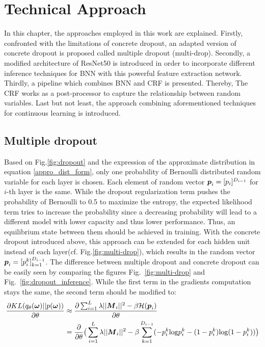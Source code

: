 \chapter{Technical Approach}
In this chapter, the approaches employed in this work are explained.
Firstly, confronted with the limitations of concrete dropout, an adapted version of concrete dropout is proposed called multiple dropout (multi-drop).
Secondly, a modified architecture of ResNet50 is introduced in order to incorporate different inference techniques for \gls{BNN} with this powerful feature extraction network.
Thirdly, a pipeline which combines \gls{BNN} and \gls{CRF} is presented.
Thereby, The \gls{CRF} works as a post-processor to capture the relationship between random variables.
Last but not least, the approach combining aforementioned techniques for continuous learning is introduced.


\section{Multiple dropout}
Based on Fig.\ref{fig:dropout} and the expression of the approximate distribution in equation \ref{appro_dist_form}, only one probability of Bernoulli distributed random variable for each layer is chosen. Each element of random vector $\boldsymbol p_i = [p_i]^{D_{i-1}}$ for $i$-th layer is the same.
While the dropout regularization term pushes the probability of Bernoulli to 0.5 to maximize the entropy, the expected likelihood term tries to increase the probability since a decreasing probability will lead to a different model with lower capacity and thus lower performance.
Thus, an equilibrium state between them should be achieved in training.
With the concrete dropout introduced above, this approach can be extended for each hidden unit instead of each layer(cf. Fig.\ref{fig:multi-drop}), which results in the random vector $\boldsymbol p_i = [p_i^k]_{k=1}^{D_{i-1}}$.
The difference between multiple dropout and concrete dropout can be easily seen by comparing the figures Fig.~\ref{fig:multi-drop} and Fig.~\ref{fig:dropout_inference}.
While the first term in the gradients computation stays the same, the second term should be modified to:
\begin{equation} 
\begin{aligned}\label{KL_grad_multi}
\frac{\partial KL(q_{\theta}(\boldsymbol \omega)||p(\boldsymbol \omega))}{\partial \theta} 
&\approx \frac{\partial \sum_{i=1}^{L}\lambda||\boldsymbol M_{i}||^{2}- \beta \mathcal H(\boldsymbol p_{i})}{\partial \theta}  \\
&= \frac{\partial}{\partial \theta} \big( \sum_{i=1}^{L}\lambda||\boldsymbol M_{i}||^{2}- \beta \sum_{k=1}^{D_{i-1}}(-p_i^k\text{log}p_i^k - (1-p_i^k)\text{log}(1-p_i^k))\big)
\end{aligned}
\end{equation}  

